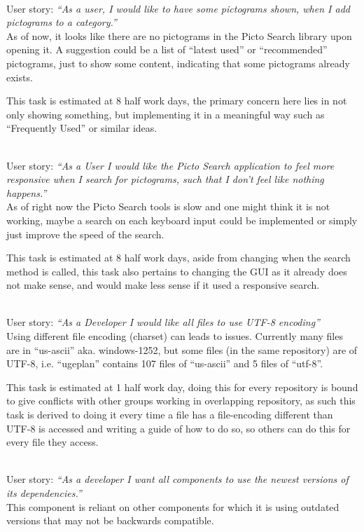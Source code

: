 \begin{description}[style=unboxed]
    \item[Picto Search - It looks like there are no pictograms, until you search for them] \hfill \\ 
        User story: \textit{``As a user, I would like to have some pictograms shown, when I add pictograms to a category.''}\\
        As of now, it looks like there are no pictograms in the Picto Search library upon opening it. 
        A suggestion could be a list of ``latest used'' or ``recommended'' pictograms, just to show some content, indicating that some pictograms already exists.

        This task is estimated at 8 half work days, the primary concern here lies in not only showing something, but implementing it in a meaningful way such as ``Frequently Used'' or similar ideas.
    \item[Picto Search - Responsive Search] \hfill \\
        User story: \textit{``As a User I would like the Picto Search application to feel more responsive when I search for pictograms, such that I don't feel like nothing happens.''} \\
        As of right now the Picto Search tools is slow and one might think it is not working, maybe a search on each keyboard input could be implemented or simply just improve the speed of the search.

        This task is estimated at 8 half work days, aside from changing when the search method is called, this task also pertains to changing the GUI as it already does not make sense, and would make less sense if it used a responsive search.
    \item[General - Use consistent file encoding] \hfill \\
        User story: \textit{``As a Developer I would like all files to use UTF-8 encoding''} \\
        Using different file encoding (charset) can leads to issues. 
        Currently many files are in ``us-ascii'' aka. windows-1252, but some files (in the same repository) are of UTF-8, i.e. ``ugeplan'' contains 107 files of ``us-ascii'' and 5 files of ``utf-8''. 

        This task is estimated at 1 half work day, doing this for every repository is bound to give conflicts with other groups working in overlapping repository, as such this task is derived to doing it every time a file has a file-encoding different than UTF-8 is accessed and writing a guide of how to do so, so others can do this for every file they access.
    \item[SequenceViewer - Update dependencies] \hfill \\
        User story: \textit{``As a developer I want all components to use the newest versions of its dependencies.''} \\
        This component is reliant on other components for which it is using outdated versions that may not be backwards compatible.


\end{description}
